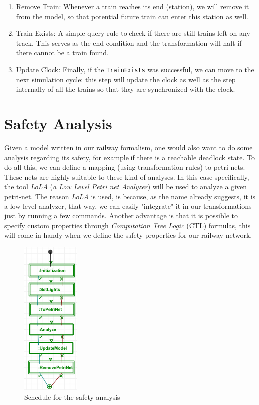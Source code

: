 \documentclass{article}
\begin{document}
\begin{enumerate}
    \item Remove Train: Whenever a train reaches its end (station), we will remove it from the model, so that potential future train can enter this station as well.
    \item Train Exists: A simple query rule to check if there are still trains left on any track. This serves as the end condition and the transformation will halt if there cannot be a train found.
    \item Update Clock: Finally, if the \texttt{TrainExists} was successful, we can move to the next simulation cycle: this step will update the clock as well as the step internally of all the trains so that they are synchronized with the clock.
\end{enumerate}

\section{Safety Analysis}

Given a model written in our railway formalism, one would also want to do some analysis regarding its safety, for example if there is a reachable deadlock state. To do all this, we can define a mapping (using transformation rules) to petri-nets. These nets are highly suitable to these kind of analyses. In this case specifically, the tool \textit{LoLA} (\textit{a Low Level Petri net Analyzer}) \cite{lola} will be used to analyze a given petri-net. The reason \textit{LoLA} is used, is because, as the name already suggests, it is a low level analyzer, that way, we can easily "integrate" it in our transformations just by running a few commands. Another advantage is that it is possible to specify custom properties through \textit{Computation Tree Logic} (CTL) formulas, this will come in handy when we define the safety properties for our railway network.

\begin{figure}[H]
    \centering
    \includegraphics[width=0.25\textwidth]{images/analyze.png}
    \caption{Schedule for the safety analysis}
    \label{schedule_safety}
\end{figure}
\end{document}
